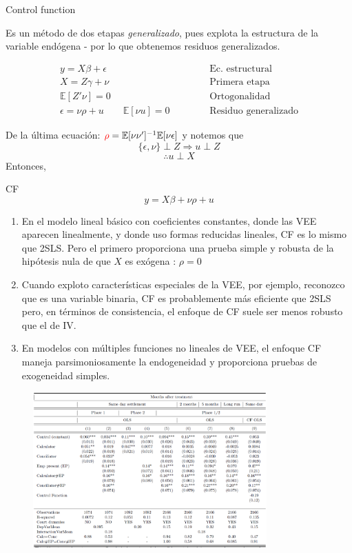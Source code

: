 \documentclass[8pt]{beamer}
\begin{document}
\begin{frame}[allowframebreaks]{Control function}

Es un método de dos etapas \emph{generalizado}, pues explota la estructura de la variable endógena - por lo que obtenemos residuos generalizados.

\begin{align*}
    y = X\beta+\epsilon\quad\quad\quad &\text{ Ec. estructural}\\
    X = Z\gamma + \nu  \quad\quad\quad &\text{ Primera etapa}\\
    \mathbb{E}[Z'\nu]= 0 \quad\quad\quad &\text{ Ortogonalidad}\\
    \epsilon = \nu\rho + u \quad \quad \mathbb{E}[\nu u]=0 \quad\quad\quad &\text{ Residuo generalizado}
\end{align*}

De la última ecuación: $\color{red}\rho \color{black}=\mathbb{E}[\nu\nu']^{-1}\mathbb{E}[\nu\epsilon]$
y notemos que 
\[\lbrace\epsilon,\nu\rbrace \perp Z \Longrightarrow u\perp Z\]
\[ \therefore u\perp X\]
Entonces,
\begin{block}{CF}
 \[y = X\beta+\nu\rho + u\]
\end{block}

\framebreak

\begin{enumerate}
    \item En el modelo lineal básico con coeficientes constantes, donde las VEE aparecen linealmente, y donde uso formas reducidas lineales, CF es lo mismo que 2SLS. Pero el primero proporciona una prueba simple y robusta de la hipótesis nula de que $X$ es exógena : $\rho=0$
    \item Cuando exploto características especiales de la VEE, por ejemplo, reconozco que es una variable binaria, CF es probablemente más eficiente que 2SLS pero, en términos de consistencia, el enfoque de CF suele ser menos robusto que el de IV.
    \item  En modelos con múltiples funciones no lineales de VEE, el enfoque CF maneja parsimoniosamente la endogeneidad y proporciona pruebas de exogeneidad simples.
\end{enumerate}

\framebreak


\begin{figure}[H]
    \begin{center}
        \includegraphics[width=0.8\textwidth]{Figuras/te.pdf}
        \end{center}
\end{figure}
    

\end{frame}
\end{document}
